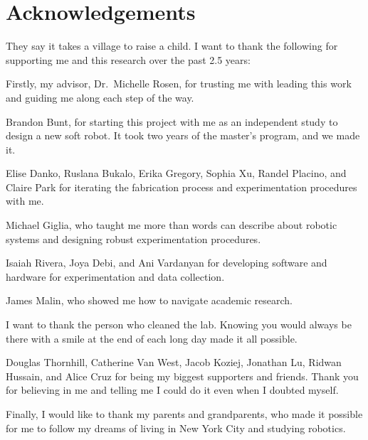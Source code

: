 \section*{Acknowledgements}

They say it takes a village to raise a child. I want to thank the following for supporting me and this research over the past 2.5 years:

Firstly, my advisor, Dr.~Michelle Rosen, for trusting me with leading this work and guiding me along each step of the way.

Brandon Bunt, for starting this project with me as an independent study to design a new soft robot. It took two years of the master's program, and we made it.

Elise Danko, Ruslana Bukalo, Erika Gregory, Sophia Xu, Randel Placino, and Claire Park for iterating the fabrication process and experimentation procedures with me.

Michael Giglia, who taught me more than words can describe about robotic systems and designing robust experimentation procedures.  

Isaiah Rivera, Joya Debi, and Ani Vardanyan for developing software and hardware for experimentation and data collection.

James Malin, who showed me how to navigate academic research. 

I want to thank the person who cleaned the lab. Knowing you would always be there with a smile at the end of each long day made it all possible. 

Douglas Thornhill, Catherine Van West, Jacob Koziej, Jonathan Lu, Ridwan Hussain, and Alice Cruz for being my biggest supporters and friends. Thank you for believing in me and telling me I could do it even when I doubted myself.

Finally, I would like to thank my parents and grandparents, who made it possible for me to follow my dreams of living in New York City and studying robotics. 
